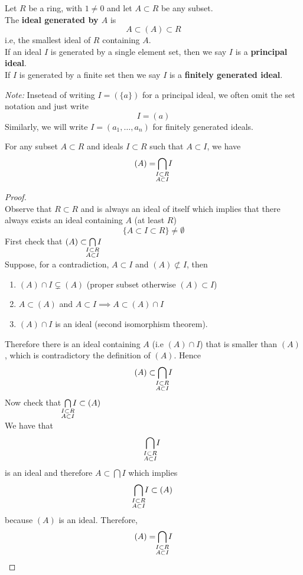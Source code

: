 \documentclass[../Main.tex]{subfiles}
\begin{document}
\begin{dfn}[title = {Ideal Generation, Principal and Finitely Generated Ideal}]
	Let $R$ be a ring, with $1\ne 0$ and let $A\subset R$ be any subset.\\
	The \textbf{ideal generated by $A$} is
	\[A\subset (A)\subset R\]
	i.e, the smallest ideal of $R$ containing $A$.\\
	If an ideal $I$ is generated by a single element set, then we say $I$ is a \textbf{principal ideal}.\\
	If $I$ is generated by a finite set then we say $I$ is a \textbf{finitely generated ideal}.
\end{dfn}
\textit{Note:} Insetead of writing $I=(\{a\})$ for a principal ideal, we often omit the set notation and just write
\[I=(a)\]
Similarly, we will write $I=(a_1,\dots, a_n)$ for finitely generated ideals.
\newpage 
\begin{prop}[title = Minimality of ideal generated by a set]
	For any subset $A \subset R$ and ideals $I\subset R$ such that $A\subset I$, we have
	\[(A)= \bigcap_{\mathclap{\substack{I \subset R\\A\subset I} } } I\]
\end{prop}
\begin{proof}~\\
	Observe that $R\subset R$ and is always an ideal of itself which implies that there always exists an ideal containing $A$ (at least $R$)
	\[\{A\subset I\subset R\} \ne \emptyset\]
	First check that $(A)\subset \bigcap\limits_{\mathclap{\substack{I \subset R \\A\subset I} } } I$\\
	Suppose, for a contradiction, $A\subset I$ and $(A) \not\subset I$, then
	\begin{enumerate}
		\item $(A) \cap I \subsetneq (A)$ (proper subset otherwise $(A)\subset I$)
		\item $A\subset (A)$ and $A\subset I \implies A\subset (A)\cap I$
		\item $(A) \cap I$ is an ideal (second isomorphism theorem).
	\end{enumerate}
	Therefore there is an ideal containing $A$ (i.e $(A) \cap I$) that is smaller than $(A)$, which is contradictory the definition of $(A)$. Hence\[(A)\subset \bigcap\limits_{\mathclap{\substack{I \subset R \\A\subset I} } } I\] 
	Now check that $\bigcap\limits_{\mathclap{\substack{I \subset R \\A\subset I} } } I\subset (A) $\\
	We have that
	\[\bigcap_{\mathclap{\substack{I \subset R\\A\subset I} } } I\] is an ideal and therefore $A\subset \bigcap I$ which implies
	\[\bigcap_{\mathclap{\substack{I \subset R \\A\subset I} } } I\subset (A) \]
	because $(A)$ is an ideal.
	Therefore,
		\[(A)= \bigcap_{\mathclap{\substack{I \subset R\\A\subset I} } } I\qedhere\]
\end{proof}
\end{document}

